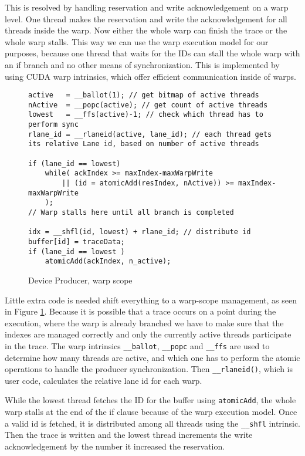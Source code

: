 	This is resolved by handling reservation and write acknowledgement on a warp level. One thread makes the reservation and write the acknowledgement for all threads inside the warp. Now either the whole warp can finish the trace or the whole warp stalls. This way we can use the warp execution model for our purposes, because one thread that waits for the IDs can stall the whole warp with an if branch and no other means of synchronization. This is implemented by using CUDA warp intrinsics, which offer efficient communication inside of warps.
\begin{figure}[t]
	\begin{lstlisting}[style=C]
active   = __ballot(1); // get bitmap of active threads 
nActive  = __popc(active); // get count of active threads
lowest   = __ffs(active)-1; // check which thread has to perform sync
rlane_id = __rlaneid(active, lane_id); // each thread gets its relative Lane id, based on number of active threads
	
if (lane_id == lowest)
	while( ackIndex >= maxIndex-maxWarpWrite 
		|| (id = atomicAdd(resIndex, nActive)) >= maxIndex-maxWarpWrite
	);
// Warp stalls here until all branch is completed

idx = __shfl(id, lowest) + rlane_id; // distribute id
buffer[id] = traceData;
if (lane_id == lowest )
	atomicAdd(ackIndex, n_active);\end{lstlisting}
	\caption{Device Producer, warp scope}
	\label{prod-cons-warp}	
\end{figure}
	Little extra code is needed shift everything to a warp-scope management, as seen in Figure \ref{prod-cons-warp}. Because it is possible that a trace occurs on a point during the execution, where the warp is already branched we have to make sure
	that the indexes are managed correctly and only the currently active threads participate in the trace. The warp intrinsics \verb|__ballot|, \verb|__popc| and \verb|__ffs| are used to determine how many threads are active, and which one has to perform the atomic operations to handle
	the producer synchronization. Then \verb|__rlaneid()|, which is user code, calculates the relative lane id for each warp. 

	While the lowest thread fetches the ID for the buffer using \verb|atomicAdd|, the whole warp stalls at the end of the if clause because of the warp execution model. Once a valid id is fetched, it is distributed among all threads using the \verb|__shfl| intrinsic. 	Then the trace is written and the lowest thread increments the write acknowledgement by the number it increased the reservation.
	
